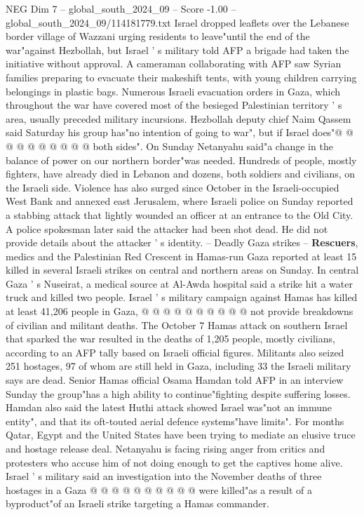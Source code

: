 \begin{textsample}{NEG Dim 7 – global\_south\_2024\_09 – Score -1.00 – global\_south\_2024\_09/114181779.txt}
Israel dropped leaflets over the Lebanese border village of Wazzani urging residents to leave"until the end of the war"against Hezbollah, but Israel ' s military told AFP a brigade had taken the initiative without approval.
A cameraman collaborating with AFP saw Syrian families preparing to evacuate their makeshift tents, with young children carrying belongings in plastic bags.
Numerous Israeli evacuation orders in Gaza, which throughout the war have covered most of the besieged Palestinian territory ' s area, usually preceded military incursions.
Hezbollah deputy chief Naim Qassem said Saturday his group has"no intention of going to war", but if Israel does"@ @ @ @ @ @ @ @ @ @ both sides".
On Sunday Netanyahu said"a change in the balance of power on our northern border"was needed.
Hundreds of people, mostly fighters, have already died in Lebanon and dozens, both soldiers and civilians, on the Israeli side.
Violence has also surged since October in the Israeli-occupied West Bank and annexed east Jerusalem, where Israeli police on Sunday reported a stabbing attack that lightly wounded an officer at an entrance to the Old City.
A police spokesman later said the attacker had been shot dead.
He did not provide details about the attacker ' s identity. -- Deadly Gaza strikes -- \textbf{Rescuers}, medics and the Palestinian Red Crescent in Hamas-run Gaza reported at least 15 killed in several Israeli strikes on central and northern areas on Sunday.
In central Gaza ' s Nuseirat, a medical source at Al-Awda hospital said a strike hit a water truck and killed two people.
Israel ' s military campaign against Hamas has killed at least 41,206 people in Gaza, @ @ @ @ @ @ @ @ @ @ not provide breakdowns of civilian and militant deaths.
The October 7 Hamas attack on southern Israel that sparked the war resulted in the deaths of 1,205 people, mostly civilians, according to an AFP tally based on Israeli official figures.
Militants also seized 251 hostages, 97 of whom are still held in Gaza, including 33 the Israeli military says are dead.
Senior Hamas official Osama Hamdan told AFP in an interview Sunday the group"has a high ability to continue"fighting despite suffering losses.
Hamdan also said the latest Huthi attack showed Israel was"not an immune entity", and that its oft-touted aerial defence systems"have limits".
For months Qatar, Egypt and the United States have been trying to mediate an elusive truce and hostage release deal.
Netanyahu is facing rising anger from critics and protesters who accuse him of not doing enough to get the captives home alive.
Israel ' s military said an investigation into the November deaths of three hostages in a Gaza @ @ @ @ @ @ @ @ @ @ were killed"as a result of a byproduct"of an Israeli strike targeting a Hamas commander.

\end{textsample}
